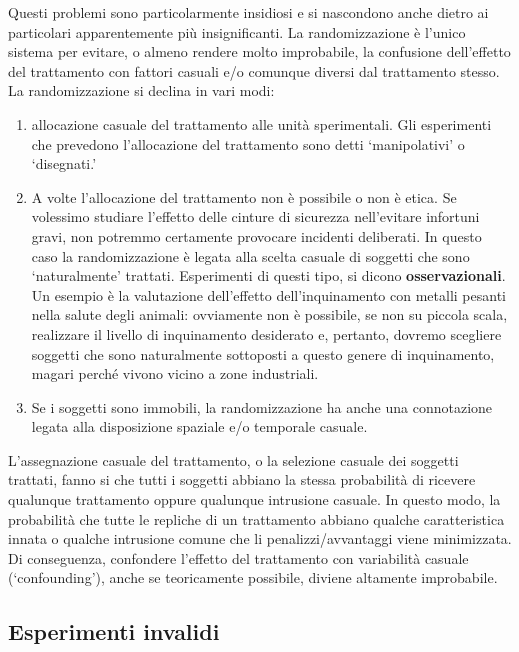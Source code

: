 \documentclass[a4paper,12pt,oneside]{book}
\providecommand{\tightlist}{%
  \setlength{\itemsep}{0pt}\setlength{\parskip}{0pt}}
\begin{document}
Questi problemi sono particolarmente insidiosi e si nascondono anche dietro ai particolari apparentemente più insignificanti. La randomizzazione è l'unico sistema per evitare, o almeno rendere molto improbabile, la confusione dell'effetto del trattamento con fattori casuali e/o comunque diversi dal trattamento stesso. La randomizzazione si declina in vari modi:

\begin{enumerate}
\def\labelenumi{\arabic{enumi}.}
\tightlist
\item
  allocazione casuale del trattamento alle unità sperimentali. Gli esperimenti che prevedono l'allocazione del trattamento sono detti `manipolativi' o `disegnati.'
\item
  A volte l'allocazione del trattamento non è possibile o non è etica. Se volessimo studiare l'effetto delle cinture di sicurezza nell'evitare infortuni gravi, non potremmo certamente provocare incidenti deliberati. In questo caso la randomizzazione è legata alla scelta casuale di soggetti che sono `naturalmente' trattati. Esperimenti di questi tipo, si dicono \textbf{osservazionali}. Un esempio è la valutazione dell'effetto dell'inquinamento con metalli pesanti nella salute degli animali: ovviamente non è possibile, se non su piccola scala, realizzare il livello di inquinamento desiderato e, pertanto, dovremo scegliere soggetti che sono naturalmente sottoposti a questo genere di inquinamento, magari perché vivono vicino a zone industriali.
\item
  Se i soggetti sono immobili, la randomizzazione ha anche una connotazione legata alla disposizione spaziale e/o temporale casuale.
\end{enumerate}

L'assegnazione casuale del trattamento, o la selezione casuale dei soggetti trattati, fanno si che tutti i soggetti abbiano la stessa probabilità di ricevere qualunque trattamento oppure qualunque intrusione casuale. In questo modo, la probabilità che tutte le repliche di un trattamento abbiano qualche caratteristica innata o qualche intrusione comune che li penalizzi/avvantaggi viene minimizzata. Di conseguenza, confondere l'effetto del trattamento con variabilità casuale (`confounding'), anche se teoricamente possibile, diviene altamente improbabile.

\hypertarget{esperimenti-invalidi}{%
\subsection{Esperimenti invalidi}\label{esperimenti-invalidi}}
\end{document}
